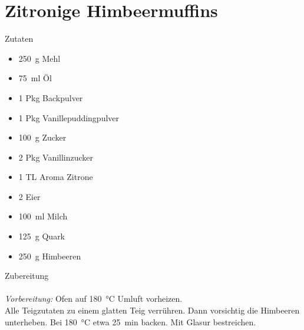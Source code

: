 \section*{Zitronige Himbeermuffins}
\ihead{}\ohead{}
\cfoot{}
{\Large Zutaten}
\begin{multicols}{2}
\begin{itemize}
    \item \SI{250}{g} Mehl
    \item \SI{75}{ml} Öl
    \item \num{1} Pkg Backpulver
    \item \num{1} Pkg Vanillepuddingpulver
    \item \SI{100}{g} Zucker
    \item \num{2} Pkg Vanillinzucker
    \item \num{1} TL Aroma Zitrone
    \item \num{2} Eier
    \item \SI{100}{ml} Milch
    \item \SI{125}{g} Quark
    \item \SI{250}{g} Himbeeren
\end{itemize}
\end{multicols}
\noindent
{\Large Zubereitung}\\
\\
\textit{Vorbereitung:} Ofen auf \SI{180}{\celsius} Umluft vorheizen.\\
Alle Teigzutaten zu einem glatten Teig verrühren. 
Dann vorsichtig die Himbeeren unterheben.
Bei \SI{180}{\celsius} etwa \SI{25}{min} backen.
Mit Glasur bestreichen.
